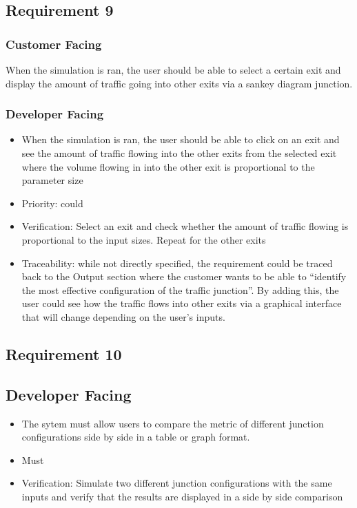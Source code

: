 \documentclass{article}
\begin{document}
\subsection{Requirement 9}
\subsubsection{Customer Facing}
When the simulation is ran, the user should be able to select a certain exit and display the amount of traffic going into other exits via a sankey diagram junction.
\subsubsection{Developer Facing}
\begin{itemize}
  \item When the simulation is ran, the user should be able to click on an exit and see the amount of traffic flowing into the other exits from the selected exit where the volume flowing in into the other exit is proportional to the parameter size
  \item Priority: could
  \item Verification: Select an exit and check whether the amount of traffic flowing is proportional to the input sizes. Repeat for the other exits
  \item Traceability: while not directly specified, the requirement could be traced back to the Output section where the customer wants to be able to “identify the most effective configuration of the traffic junction”. By adding this, the user could see how the traffic flows into other exits via a graphical interface that will change depending on the user's inputs.
\end{itemize}

\subsection{Requirement 10}
\subsection{Developer Facing}
\begin{itemize}
  \item The sytem must allow users to compare the metric of different junction configurations side by side in a table or graph format.
  \item Must
  \item Verification: Simulate two different junction configurations with the same inputs and verify that the results are displayed in a side by side comparison
\end{itemize}
\end{document}
